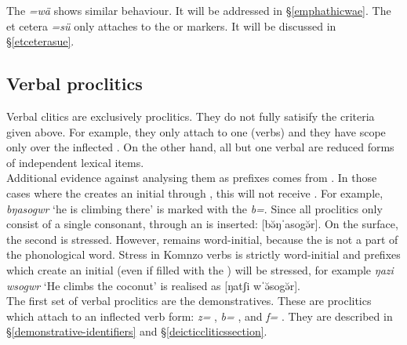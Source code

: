 The   \emph{=wä} shows similar behaviour. It will be addressed in \S{}\ref{emphathicwae}. The et cetera  \emph{=sü} only attaches to the  or   markers. It will be discussed in \S{}\ref{etceterasue}.

\subsection{Verbal proclitics}\label{verbproclitics}

Verbal clitics are exclusively proclitics. They do not fully satisify the criteria given above. For example, they only attach to one  (verbs) and they have scope only over the inflected . On the other hand, all but one verbal  are reduced forms of independent lexical items.\\

Additional evidence against analysing them as prefixes comes from . In those cases where the  creates an initial  through , this  will not receive . For example, \emph{bŋasogwr} `he is climbing there' is marked with the   \emph{b=}. Since all proclitics only consist of a single consonant, through  an  is inserted: [bə̆ŋˈasogə̆r]. On the surface, the second  is stressed. However,  remains word-initial, because the  is not a part of the phonological word. Stress in Komnzo verbs is strictly word-initial and prefixes which create an initial  (even if filled with the ) will be stressed, for example \emph{ŋazi wsogwr} `He climbs the coconut' is realised as [ŋatʃi wˈə̆sogə̆r].\\

The first set of verbal proclitics are the  demonstratives. These are  proclitics which attach to an inflected verb form: \emph{z=} \Prox{}, \emph{b=} \Med{}, and \emph{f=} \Dist{}. They are described in \S{}\ref{demonstrative-identifiers} and \S{}\ref{deicticcliticssection}.\\

